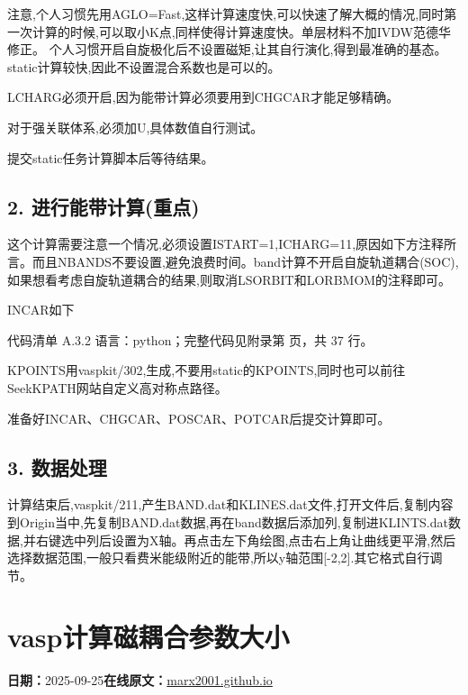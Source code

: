 \documentclass[lang=cn,scheme=chinese,color=blue,device=normal,toc=onecol,math=cm]{elegantbook}
\begin{document}
注意,个人习惯先用AGLO=Fast,这样计算速度快,可以快速了解大概的情况,同时第一次计算的时候,可以取小K点,同样使得计算速度快。单层材料不加IVDW范德华修正。 个人习惯开启自旋极化后不设置磁矩,让其自行演化,得到最准确的基态。static计算较快,因此不设置混合系数也是可以的。\par


LCHARG必须开启,因为能带计算必须要用到CHGCAR才能足够精确。\par


对于强关联体系,必须加U,具体数值自行测试。\par


提交static任务计算脚本后等待结果。\par


\subsection{2. 进行能带计算(重点)}


这个计算需要注意一个情况,必须设置ISTART=1,ICHARG=11,原因如下方注释所言。而且NBANDS不要设置,避免浪费时间。band计算不开启自旋轨道耦合(SOC),如果想看考虑自旋轨道耦合的结果,则取消LSORBIT和LORBMOM的注释即可。\par


INCAR如下\par


\begin{codeindexbox}{代码清单 A.3.2}
语言：python；完整代码见附录第 \pageref{code:3:2} 页，共 37 行。
\end{codeindexbox}


KPOINTS用vaspkit/\allowbreak{}302,生成,不要用static的KPOINTS,同时也可以前往SeekKPATH网站自定义高对称点路径。\par


准备好INCAR、CHGCAR、POSCAR、POTCAR后提交计算即可。\par


\subsection{3. 数据处理}


计算结束后,vaspkit/\allowbreak{}211,产生BAND.dat和KLINES.dat文件,打开文件后,复制内容到Origin当中,先复制BAND.dat数据,再在band数据后添加列,复制进KLINTS.dat数据,并右键选中列后设置为X轴。再点击左下角绘图,点击右上角让曲线更平滑,然后选择数据范围,一般只看费米能级附近的能带,所以y轴范围[-2,2].其它格式自行调节。\par



\section{vasp计算磁耦合参数大小}
\begin{articlemeta}
\textbf{日期：}2025-09-25\hfill\textbf{在线原文：}\href{https://marx2001.github.io/sci-note\_posts/20250925-J}{marx2001.github.io}
\end{articlemeta}
\end{document}
